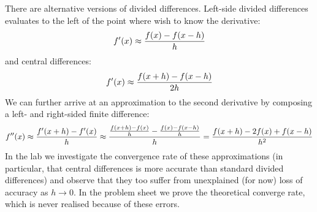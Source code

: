 There are alternative versions of divided differences. Left-side divided differences evaluates to the left of the point where wish to know the derivative:
\[
f'(x) \ensuremath{\approx} {f(x) - f(x-h) \over h}
\]
and central differences:
\[
f'(x) \ensuremath{\approx} {f(x + h) - f(x - h) \over 2h}
\]
We can further arrive at an approximation to the second derivative by composing a left- and right-sided finite difference:
\[
f''(x) \ensuremath{\approx} {f'(x+h) - f'(x) \over h} \ensuremath{\approx} {{f(x+h) - f(x) \over h} - {f(x) - f(x-h) \over h} \over h}
= {f(x+h) - 2f(x)  + f(x-h) \over h^2}
\]
In the lab we investigate the convergence rate of these approximations (in particular, that  central differences is more accurate than standard divided differences) and observe that they too suffer from unexplained (for now) loss of accuracy as $h \ensuremath{\rightarrow} 0$. In the problem sheet we prove the theoretical converge rate, which is never realised because of these errors.



